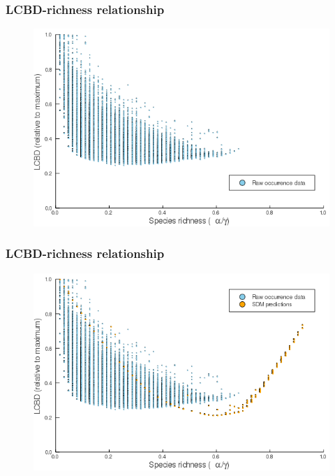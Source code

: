 \documentclass[10pt, aspectratio=1610]{beamer}
\begin{document}
\begin{frame}
  \frametitle{LCBD-richness relationship}
  \begin{figure}
    \centering
    \includegraphics[scale=0.5]{fig/06_raw_relation.png}
  \end{figure}
\end{frame}

\begin{frame}
  \frametitle{LCBD-richness relationship}
  \begin{figure}
    \centering
    \includegraphics[scale=0.5]{fig/06_cmb_relation-oneplot.png}
  \end{figure}
\end{frame}
\end{document}
